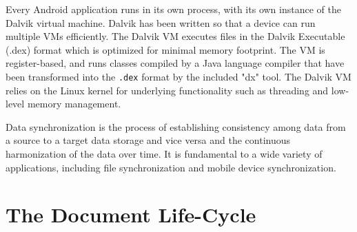 \documentclass[%
	final,
	notitlepage,
	narroweqnarray,
	inline,
	twoside,
	]{ieee}
\begin{document}
Every Android application runs in its own process, with its own instance of the 
Dalvik virtual machine. Dalvik has been written so that a device can run multiple 
VMs efficiently. The Dalvik VM executes files in the Dalvik Executable (.dex) 
format which is optimized for minimal memory footprint. The VM is register-based, 
and runs classes compiled by a Java language compiler that have been transformed 
into the \texttt{.dex} format by the included "dx" tool. The Dalvik VM relies on 
the Linux kernel for underlying functionality such as threading and low-level 
memory management.

Data synchronization is the process of establishing consistency among data from a 
source to a target data storage and vice versa and the continuous harmonization of 
the data over time. It is fundamental to a wide variety of applications, including 
file synchronization and mobile device synchronization.

\section{The Document Life-Cycle}
\end{document}
